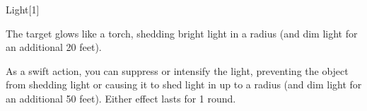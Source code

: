 \begin{spellsection}{Light}[1]
    \begin{spellheader}
    \end{spellheader}
    \begin{spellcontent}
        \begin{spelltargetinginfo}
            \spellrng{\rngtouch}
        \end{spelltargetinginfo}
        \begin{spelleffects}

            \spelleffect The target glows like a torch, shedding bright light in a \areamed radius (and dim light for an additional 20 feet).

            As a swift action, you can suppress or intensify the light, preventing the object from shedding light or causing it to shed light in up to a \arealarge radius (and dim light for an additional 50 feet). Either effect lasts for 1 round.
            \spelldur \durlong \dismissable
        \end{spelleffects}
    \end{spellcontent}
    \begin{spellfooter}
    \end{spellfooter}
\end{spellsection}


